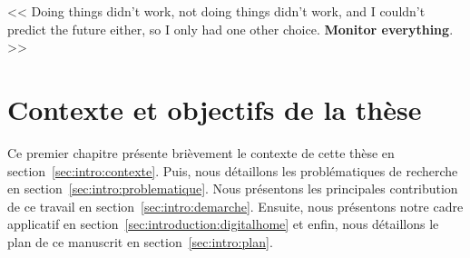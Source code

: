 \begin{savequote}[6cm]
<< Doing things didn't work, not doing things didn't work, and I couldn't predict the future either, so I only had one other choice. \textbf{Monitor everything}. >>
\end{savequote}
\chapter{Contexte et objectifs de la thèse}
\chaptertoc

Ce premier chapitre présente brièvement le contexte de cette thèse en section~\ref{sec:intro:contexte}. Puis, nous détaillons les problématiques de recherche en section~\ref{sec:intro:problematique}. Nous présentons les principales contribution de ce travail en section~\ref{sec:intro:demarche}. Ensuite, nous présentons notre cadre applicatif en section~\ref{sec:introduction:digitalhome} et enfin, nous détaillons le plan de ce manuscrit en section~\ref{sec:intro:plan}.






